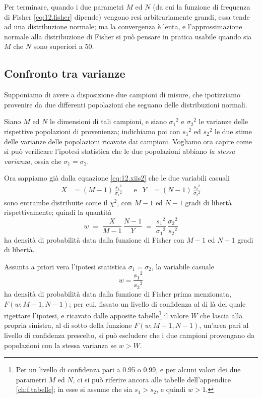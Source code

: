 Per terminare, quando i due parametri $M$ ed $N$ (da cui la
funzione di frequenza di Fisher \eqref{eq:12.fisher}
dipende) vengono resi arbitrariamente grandi, essa tende ad
una distribuzione normale; ma la convergenza \`e lenta, e
l'approssimazione normale alla distribuzione di Fisher si
pu\`o pensare in pratica usabile quando sia $M$ che $N$ sono
superiori a 50.%

\subsection{Confronto tra varianze}%
Supponiamo di avere a disposizione due campioni di misure,
che ipotizziamo provenire da due differenti popolazioni che
seguano delle distribuzioni normali.

Siano $M$ ed $N$ le dimensioni di tali campioni, e siano
${\sigma_1}^2$ e ${\sigma_2}^2$ le varianze delle rispettive
popolazioni di provenienza; indichiamo poi con ${s_1}^2$ ed
${s_2}^2$ le due stime delle varianze delle popolazioni
ricavate dai campioni.  Vogliamo ora capire come si pu\`o
verificare l'ipotesi statistica che le due popolazioni
abbiano \emph{la stessa varianza}, ossia che $\sigma_1 =
\sigma_2$.

Ora sappiamo gi\`a dalla equazione \eqref{eq:12.xiis2}
che le due variabili casuali
\begin{align*}
  X &= (M - 1) \, \frac{{s_1}^2}{{\sigma_1}^2}
    &&\text{e} & Y &= (N - 1) \,
    \frac{{s_2}^2}{{\sigma_2}^2}
\end{align*}
sono entrambe distribuite come il $\chi^2$, con $M - 1$
ed $N - 1$ gradi di libert\`a rispettivamente; quindi
la quantit\`a
\begin{equation*}
  w \; = \; \frac{X}{M - 1} \, \frac{N - 1}{Y} \; = \;
    \frac{{s_1}^2}{{\sigma_1}^2} \,
    \frac{{\sigma_2}^2}{{s_2}^2}
\end{equation*}
ha densit\`a di probabilit\`a data dalla funzione di
Fisher con $M - 1$ ed $N - 1$ gradi di libert\`a.

Assunta a priori vera l'ipotesi statistica $\sigma_1 =
\sigma_2$, la variabile casuale
\begin{equation*}
  w = \frac{{s_1}^2}{{s_2}^2}
\end{equation*}
ha densit\`a di probabilit\`a data dalla funzione di Fisher
prima menzionata, $F(w; M-1, N-1)$; per cui, fissato un
livello di confidenza al di l\`a del quale rigettare
l'ipotesi, e ricavato dalle apposite tabelle\/\footnote{Per
  un livello di confidenza pari a 0.95 o 0.99, e per alcuni
  valori dei due parametri $M$ ed $N$, ci si pu\`o riferire
  ancora alle tabelle dell'appendice \ref{ch:f.tabelle}; in
  esse si assume che sia $s_1 > s_2$, e quindi $w > 1$.}  il
valore $W$ che lascia alla propria sinistra, al di sotto
della funzione $F(w; M-1, N-1)$, un'area pari al livello di
confidenza prescelto, si pu\`o escludere che i due campioni
provengano da popolazioni con la stessa varianza se $w >
W$.%

